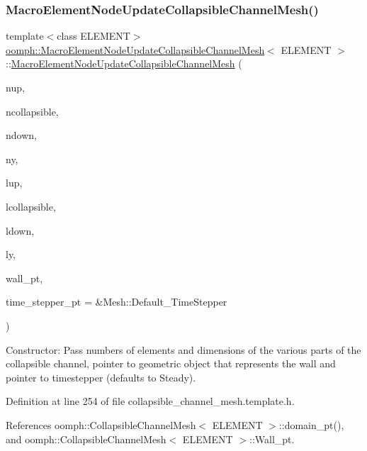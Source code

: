 \subsubsection{\texorpdfstring{Macro\+Element\+Node\+Update\+Collapsible\+Channel\+Mesh()}{MacroElementNodeUpdateCollapsibleChannelMesh()}}
{\footnotesize\ttfamily template$<$class E\+L\+E\+M\+E\+NT$>$ \\
\hyperlink{classoomph_1_1MacroElementNodeUpdateCollapsibleChannelMesh}{oomph\+::\+Macro\+Element\+Node\+Update\+Collapsible\+Channel\+Mesh}$<$ E\+L\+E\+M\+E\+NT $>$\+::\hyperlink{classoomph_1_1MacroElementNodeUpdateCollapsibleChannelMesh}{Macro\+Element\+Node\+Update\+Collapsible\+Channel\+Mesh} (\begin{DoxyParamCaption}\item[{const unsigned \&}]{nup,  }\item[{const unsigned \&}]{ncollapsible,  }\item[{const unsigned \&}]{ndown,  }\item[{const unsigned \&}]{ny,  }\item[{const double \&}]{lup,  }\item[{const double \&}]{lcollapsible,  }\item[{const double \&}]{ldown,  }\item[{const double \&}]{ly,  }\item[{Geom\+Object $\ast$}]{wall\+\_\+pt,  }\item[{Time\+Stepper $\ast$}]{time\+\_\+stepper\+\_\+pt = {\ttfamily \&Mesh\+:\+:Default\+\_\+TimeStepper} }\end{DoxyParamCaption})\hspace{0.3cm}{\ttfamily [inline]}}



Constructor\+: Pass numbers of elements and dimensions of the various parts of the collapsible channel, pointer to geometric object that represents the wall and pointer to timestepper (defaults to Steady). 



Definition at line 254 of file collapsible\+\_\+channel\+\_\+mesh.\+template.\+h.



References oomph\+::\+Collapsible\+Channel\+Mesh$<$ E\+L\+E\+M\+E\+N\+T $>$\+::domain\+\_\+pt(), and oomph\+::\+Collapsible\+Channel\+Mesh$<$ E\+L\+E\+M\+E\+N\+T $>$\+::\+Wall\+\_\+pt.

\mbox{\label{classoomph_1_1MacroElementNodeUpdateCollapsibleChannelMesh_a284ffdb8ab08e5f817b14d69913f4496}} 
